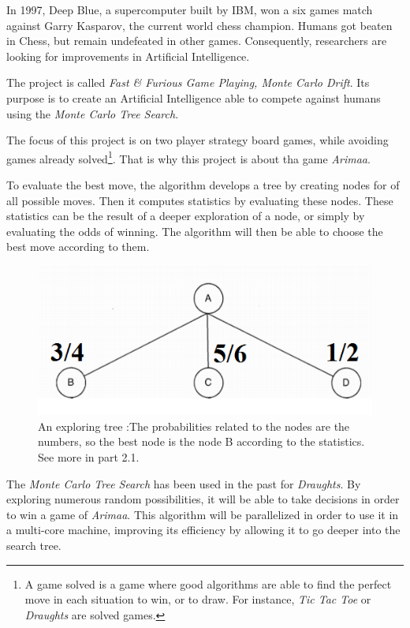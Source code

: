 
In 1997, Deep Blue, a supercomputer built by IBM, won a six games match against Garry Kasparov, the current world chess champion. Humans got beaten in Chess, but remain undefeated in other games. Consequently, researchers are looking for improvements in Artificial Intelligence.
\newline

The project is called \emph{Fast \& Furious Game Playing, Monte Carlo Drift}. Its purpose is to create an Artificial Intelligence able to compete against humans using the \emph{Monte Carlo Tree Search}.
\newline

The focus of this project is on two player strategy board games, while avoiding games already solved\footnote{A game solved is a game where good algorithms are able to find the perfect move in each situation to win, or to draw. For instance, \textit{Tic Tac Toe} or \textit{Draughts} are solved games.}. That is why this project is about tha game \emph{Arimaa}.
\newline

To evaluate the best move, the algorithm develops a tree by creating nodes for of all possible moves. Then it computes statistics by evaluating these nodes. These statistics can be the result of a deeper exploration of a node, or simply by evaluating the odds of winning. The algorithm will then be able to choose the best move according to them.
\smallbreak
\begin{figure}[!h] 
\centerline{\includegraphics[scale=0.50]{1_Presentation/1.1_Our_project_Dan/tree}}
  \caption{An exploring tree :\newline The probabilities related to the nodes are the numbers, so the best node is the node B according to the statistics. See more in part 2.1.} %
  \centering
\end{figure}
The \emph{Monte Carlo Tree Search} has been used in the past for \textit{Draughts}. By exploring numerous random possibilities, it will be able to take decisions in order to win a game of \emph{Arimaa}.
This algorithm will be parallelized in order to use it in a multi-core machine, improving its efficiency by allowing it to go deeper into the search tree.
\newline

